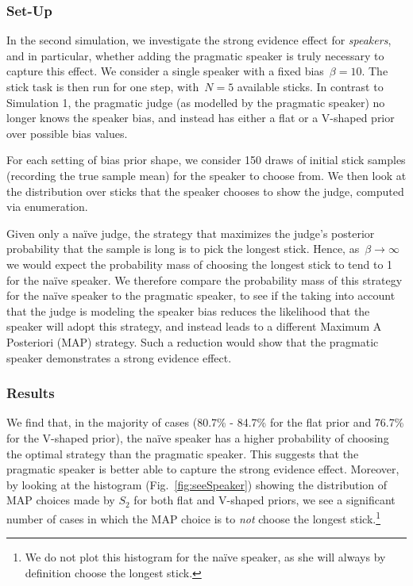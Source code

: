 \documentclass[10pt,letterpaper]{article}
\begin{document}
\subsubsection{Set-Up}
In the second simulation, we investigate the strong evidence effect for \textit{speakers}, and in particular, whether adding the 
pragmatic speaker is truly necessary to capture this effect. We consider a single speaker with a fixed bias~${\beta=10}$.
The stick task is then run for one step, with~${N=5}$ available sticks. In contrast to Simulation 1, the pragmatic judge 
(as modelled by the pragmatic speaker) no longer knows the speaker bias, and instead has either a flat or a V-shaped prior over possible bias values.

For each setting of bias prior shape, we consider 150 draws of initial stick samples (recording the true sample mean)
for the speaker to choose from. We then look at the distribution over sticks that the speaker chooses to show the judge, computed via enumeration.

Given only a na\"ive judge, the strategy that maximizes the judge's posterior probability that the sample is long is to pick the longest stick. Hence, as~${\beta\to\infty}$ 
we would expect the probability mass of choosing the longest stick to tend to 1 for the na\"ive speaker. We therefore compare the probability mass of this 
strategy for the na\"ive speaker to the pragmatic speaker, to see if the taking into account that the judge is modeling the speaker bias reduces the 
likelihood that the speaker will adopt this strategy, and instead leads to a different Maximum A Posteriori (MAP) strategy. Such
a reduction would show that the pragmatic speaker demonstrates a strong evidence effect.

\subsubsection{Results}

We find that, in the majority of cases (80.7\% - 84.7\% for the flat prior and 76.7\% for the V-shaped prior), the na\"ive speaker has a higher probability of choosing the optimal 
strategy than the pragmatic speaker. This suggests that the pragmatic speaker is better able to capture the strong evidence effect.
Moreover, by looking at the histogram (Fig.~\ref{fig:seeSpeaker}) showing the distribution of MAP choices made by $S_2$ for both flat and V-shaped priors,
we see a significant number of cases in which the MAP choice is to \textit{not} choose the longest stick.\footnote{We do not plot this histogram for the na\"ive speaker,
as she will always by definition choose the longest stick.} 
\end{document}
